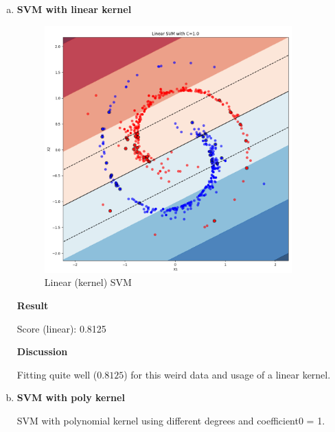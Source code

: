 \documentclass[12pt,a4paper]{article}
\begin{document}
\newpage
\begin{enumerate}[a)]
  
  
  \item \textbf{SVM with linear kernel}
  
\begin{figure}[H]
	\centering
  \includegraphics[width=0.9\textwidth]{figures/svm2_a_c1.png}
	\caption{Linear (kernel) SVM}
	\label{svm2_a_c1}
\end{figure}

\textbf{Result}

  Score (linear): 0.8125

\textbf{Discussion}

Fitting quite well ($0.8125$) for this weird data and usage of a linear kernel. 

\newpage
  \item \textbf{SVM with poly kernel}

SVM with polynomial kernel using different degrees and coefficient0 = 1.


\end{enumerate}
\end{document}
